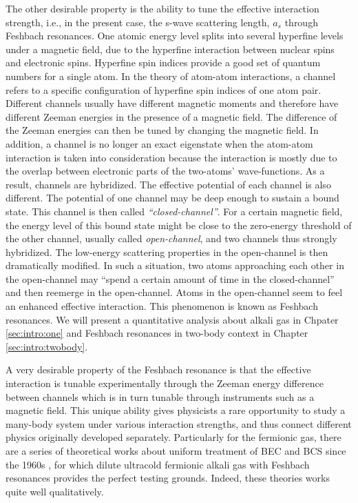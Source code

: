 The other desirable property is the ability to  tune the effective interaction strength, i.e., in the present case, the s-wave scattering length, $a_{s}$ through  Feshbach resonances.  One atomic energy level  splits into several hyperfine levels under a magnetic field,  due to the hyperfine interaction between nuclear spins and electronic spins. Hyperfine spin indices provide a good set of quantum numbers for a single atom.  In the theory of  atom-atom interactions, a channel refers to a specific configuration of hyperfine spin indices of one atom pair. Different channels usually  have different magnetic moments and therefore have different Zeeman energies in the presence of a magnetic field.  The difference of the Zeeman energies can then be tuned by changing the magnetic field.  In addition, a channel is no longer an exact eigenstate when the atom-atom interaction is taken into consideration because the interaction is mostly due to the overlap between electronic parts of  the two-atoms' wave-functions. As a result, channels are hybridized.  The effective potential of each channel is also different.  The potential of one  channel  may be deep enough to sustain a bound state.  This channel is then called \emph{``closed-channel''}.  For a certain magnetic field,  the energy level of this bound state might be close to the zero-energy threshold of the other channel, usually called \emph{open-channel}, and two channels  thus strongly hybridized.  The low-energy scattering properties in the open-channel is then dramatically modified.   In such a situation, two atoms approaching each other in the open-channel may ``spend a certain amount of time in the closed-channel'' and then reemerge in the open-channel.  Atoms in the open-channel seem to feel an enhanced effective interaction.  This phenomenon is known as Feshbach resonances.    We will present a  quantitative analysis about alkali gas in Chpater \ref{sec:intro:one} and  Feshbach resonances in two-body context in Chapter \ref{sec:intro:twobody}. 




A very desirable property of the Feshbach resonance is that the effective interaction is tunable experimentally through the Zeeman energy difference between channels which is in turn  tunable through  instruments such as a magnetic field.  
This unique ability gives physicists a rare opportunity to study  a many-body system under various interaction strengths,  and thus connect different physics originally developed separately.  Particularly for the fermionic gas, there are a series of  theoretical works about uniform treatment of  BEC and BCS since the 1960s \cite{Eagle,LeggettCrossover,Nozieres,RanderiaBEC}, for which dilute ultracold fermionic alkali gas with  Feshbach resonances provides the perfect testing grounds.  Indeed,  these theories works quite well  qualitatively.  

